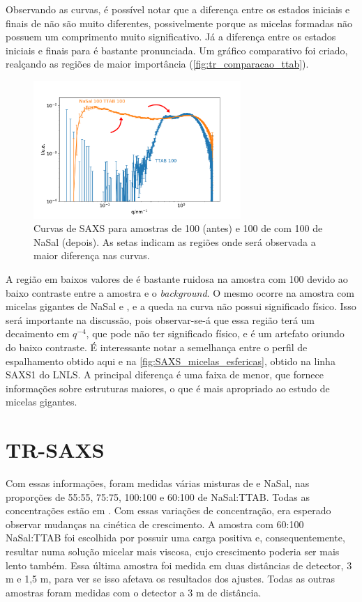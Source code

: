 	Observando as curvas, é possível notar que a diferença entre os estados iniciais e finais de \DTAB{} não são muito diferentes, possivelmente porque as micelas formadas não possuem um comprimento muito significativo. Já a diferença entre os estados iniciais e finais para \TTAB{} é bastante pronunciada. Um gráfico comparativo foi criado, realçando as regiões de maior importância (\autoref{fig:tr_comparacao_ttab}).
	
	\begin{figure}[h]
		\centering
		\includegraphics[width=0.7\textwidth]{imagens/saxs/tr_comparacao_antes_depois}
		\caption{Curvas de SAXS para amostras de \TTAB{} 100\mM{} (antes) e 100 \mM de \TTAB{} com 100 \mM{} de NaSal (depois). As setas indicam as regiões onde será observada a maior diferença nas curvas.}
		\label{fig:tr_comparacao_ttab}
	\end{figure}
	
	A região em baixos valores de \q{} é bastante ruidosa na amostra com \TTAB{} 100 \mM{} devido ao baixo contraste entre a amostra e o \emph{background}. O mesmo ocorre na amostra com micelas gigantes de NaSal e \TTAB, e a queda na curva não possui significado físico. Isso será importante na discussão, pois observar-se-á que essa região terá um decaimento em \(q^{-4}\), que pode não ter significado físico, e é um artefato oriundo do baixo contraste. É interessante notar a semelhança entre o perfil de espalhamento obtido aqui e na \autoref{fig:SAXS_micelas_esfericas}, obtido na linha SAXS1 do LNLS. A principal diferença é uma faixa de \q{} menor, que fornece informações sobre estruturas maiores, o que é mais apropriado ao estudo de micelas gigantes.
	
	\section{TR-SAXS} 
	\label{sec:tr-saxs}
	Com essas informações, foram medidas várias misturas de \TTAB{} e NaSal, nas proporções de 55:55, 75:75, 100:100 e 60:100 de NaSal:TTAB. Todas as concentrações estão em \mM. Com essas variações de concentração, era esperado observar mudanças na cinética de crescimento. A amostra com 60:100 NaSal:TTAB foi escolhida por possuir uma carga positiva e, consequentemente, resultar numa solução micelar mais viscosa, cujo crescimento poderia ser mais lento também. Essa última amostra foi medida em duas distâncias de detector, 3 m e 1,5 m, para ver se isso afetava os resultados dos ajustes. Todas as outras amostras foram medidas com o detector a 3 m de distância.
	
